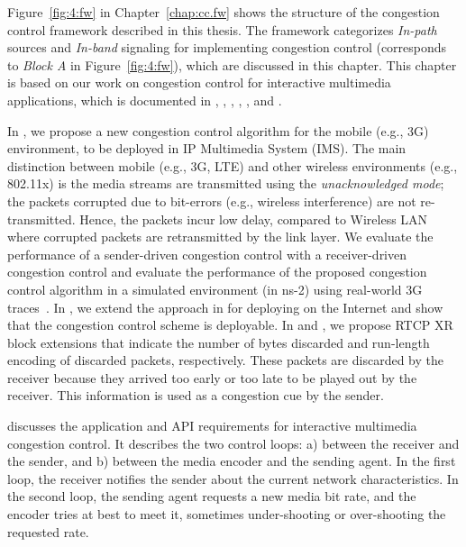 Figure~\ref{fig:4:fw} in Chapter~\ref{chap:cc.fw} shows the structure of the
congestion control framework described in this thesis. The framework
categorizes \emph{In-path} sources and \emph{In-band} signaling for
implementing congestion control (corresponds to \emph{Block A} in
Figure~\ref{fig:4:fw}), which are discussed in this chapter. This chapter is
based on our work on congestion control for interactive multimedia
applications, which is documented in , ,
, \cite{draft.xr.discard.rle},
\cite{draft.xr.bytes.discarded}, \cite{singh:2010.thesis} and
\cite{Singh:control.loops.api}.

In , we propose a new congestion control algorithm for the
mobile (e.g., 3G) environment, to be deployed in IP Multimedia System (IMS).
The main distinction between mobile (e.g., 3G, LTE) and other wireless
environments (e.g., 802.11x) is the media streams are transmitted using the
\emph{unacknowledged mode}; the packets corrupted due to bit-errors (e.g.,
wireless interference) are not re-transmitted. Hence, the packets incur low
delay, compared to Wireless LAN where corrupted packets are retransmitted by
the link layer. We evaluate the performance of a sender-driven congestion
control with a receiver-driven congestion control and evaluate the performance
of the proposed congestion control algorithm in a simulated environment (in
ns-2) using real-world 3G traces~\cite{s4.eval.bitrate, 3gppSim}. In
, we extend the approach in  for deploying on
the Internet and show that the congestion control scheme is deployable. In
\cite{draft.xr.discard.rle} and \cite{draft.xr.bytes.discarded}, we propose
RTCP XR block extensions that indicate the number of bytes discarded and
run-length encoding of discarded packets, respectively. These packets are
discarded by the receiver because they arrived too early or too late to be
played out by the receiver. This information is used as a congestion cue by
the sender.

\cite{Singh:control.loops.api} discusses the application and API requirements
for interactive multimedia congestion control. It describes the two control
loops: a) between the receiver and the sender, and b) between the media
encoder and the sending agent. In the first loop, the receiver notifies the
sender about the current network characteristics. In the second loop, the
sending agent requests a new media bit rate, and the encoder tries at best to
meet it, sometimes under-shooting or over-shooting the requested rate.

